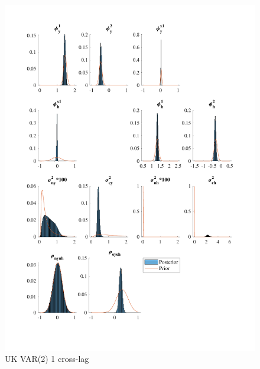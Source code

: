 \documentclass[
  12pt,
]{article}
\begin{document}
\begin{figure}

{\centering \includegraphics[width=0.85\linewidth]{../../Regression/Bayesian_UC_VAR2_drift_Crosscycle1lag/OutputData/posteriorpriordistribution_UK} 

}

\caption{UK VAR(2) 1 cross-lag}\label{fig:unnamed-chunk-10}
\end{figure}
\end{document}
